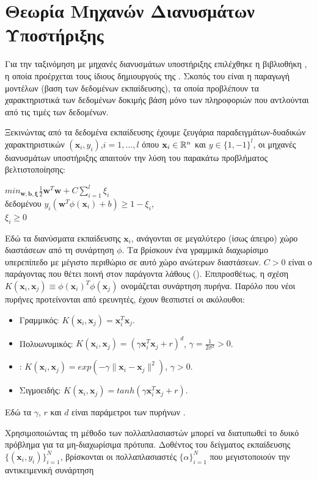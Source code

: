 \section{Θεωρία Μηχανών Διανυσμάτων Υποστήριξης}
Για την ταξινόμηση με μηχανές διανυσμάτων υποστήριξης επιλέχθηκε η βιβλιοθήκη , η οποία προέρχεται τους ίδιους δημιουργούς της . Σκοπός του  είναι η παραγωγή μοντέλων (βαση των δεδομένων εκπαίδευσης), τα οποία προβλέπουν τα χαρακτηριστικά των δεδομένων δοκιμής βάση μόνο των πληροφοριών που αντλούνται από τις τιμές των δεδομένων.\par
Ξεκινώντας από τα δεδομένα εκπαίδευσης έχουμε ζευγάρια παραδειγμάτων-δυαδικών χαρακτηριστικών $(\mathbf{x}_i,y_i)$,$i=1,...,l$ όπου $\mathbf{x}_i\in\mathbb{R}^n$ και $y\in\{1,-1\}^l$, οι μηχανές διανυσμάτων  υποστήριξης  απαιτούν την λύση του παρακάτω προβλήματος βελτιστοποίησης:
\begin{center}
$min_{\mathbf{w},\mathbf{b},\mathbf{\xi}} \frac{1}{2}\mathbf{w}^T\mathbf{w}+C\sum_{i=1}^l\xi_i$\\
δεδομένου $y_i(\mathbf{w}^T\phi(\mathbf{x}_i)+b)\geq 1-\xi_i$,\\
$\xi_i \geq 0$
\end{center}
Εδώ τα διανύσματα εκπαίδευσης $\mathbf{x}_i$, ανάγονται σε μεγαλύτερο (ίσως άπειρο) χώρο διαστάσεων από τη συνάρτηση $\phi$. Τα  βρίσκουν ένα γραμμικά διαχωρίσιμο υπερεπίπεδο με μέγιστο περιθώριο σε αυτό χώρο ανώτερων διαστάσεων. $C>0$ είναι ο παράγοντας που θέτει ποινή στον παράγοντα λάθους (). Επιπροσθέτως, η σχέση $K(\mathbf{x}_i,\mathbf{x}_j)\equiv \phi(\mathbf{x}_i)^T\phi(\mathbf{x}_j)$ ονομάζεται συνάρτηση πυρήνα. Παρόλο που νέοι πυρήνες προτείνονται από ερευνητές, έχουν θεσπιστεί οι ακόλουθοι:
\begin{itemize}
\item Γραμμικός: $K(\mathbf{x}_i,\mathbf{x}_j)= \mathbf{x}_i^T\mathbf{x}_j$.
\item Πολυωνυμικός: $K(\mathbf{x}_i,\mathbf{x}_j)= (\gamma\mathbf{x}_i^T\mathbf{x}_j+r)^d$, $\gamma=\frac{1}{2\sigma^2}>0$.
\item {}: $K(\mathbf{x}_i,\mathbf{x}_j)= exp(-\gamma\|\mathbf{x}_i-\mathbf{x}_j\|^2)$, $\gamma>0$.
\item Σιγμοειδής: $K(\mathbf{x}_i,\mathbf{x}_j)= tanh(\gamma\mathbf{x}_i^T\mathbf{x}_j +r)$.
\end{itemize}
Εδώ τα $\gamma$, $r$ και $d$ είναι παράμετροι των πυρήνων \cite{libsvmguide}.\par
Χρησιμοποιώντας τη μέθοδο των πολλαπλασιαστών  μπορεί να διατυπωθεί το δυικό πρόβλημα για τα μη-διαχωρίσιμα πρότυπα. Δοθέντος του δείγματος εκπαίδευσης $\{(\mathbf{x}_i,y_i)\}_{i=1}^N$, βρίσκονται οι πολλαπλασιαστές  $\{\alpha\}_{i=1}^N$ που μεγιστοποιούν την αντικειμενική συνάρτηση\\
